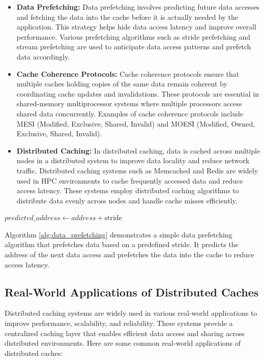 \documentclass[12pt]{book} %
\begin{document}
\begin{itemize}
    \item \textbf{Data Prefetching:} Data prefetching involves predicting future data accesses and fetching the data into the cache before it is actually needed by the application. This strategy helps hide data access latency and improve overall performance. Various prefetching algorithms such as stride prefetching and stream prefetching are used to anticipate data access patterns and prefetch data accordingly.
    
    \item \textbf{Cache Coherence Protocols:} Cache coherence protocols ensure that multiple caches holding copies of the same data remain coherent by coordinating cache updates and invalidations. These protocols are essential in shared-memory multiprocessor systems where multiple processors access shared data concurrently. Examples of cache coherence protocols include MESI (Modified, Exclusive, Shared, Invalid) and MOESI (Modified, Owned, Exclusive, Shared, Invalid).
    
    \item \textbf{Distributed Caching:} In distributed caching, data is cached across multiple nodes in a distributed system to improve data locality and reduce network traffic. Distributed caching systems such as Memcached and Redis are widely used in HPC environments to cache frequently accessed data and reduce access latency. These systems employ distributed caching algorithms to distribute data evenly across nodes and handle cache misses efficiently.
\end{itemize}

\FloatBarrier
\begin{algorithm}[h]
\caption{Data Prefetching Algorithm}\label{alg:data_prefetching}
\begin{algorithmic}[1]
    \State $predicted\_address \gets address + \text{stride}$
    \State {}
\EndFunction
\end{algorithmic}
\end{algorithm}
\FloatBarrier

Algorithm \ref{alg:data_prefetching} demonstrates a simple data prefetching algorithm that prefetches data based on a predefined stride. It predicts the address of the next data access and prefetches the data into the cache to reduce access latency.

\subsection{Real-World Applications of Distributed Caches}
Distributed caching systems are widely used in various real-world applications to improve performance, scalability, and reliability. These systems provide a centralized caching layer that enables efficient data access and sharing across distributed environments. Here are some common real-world applications of distributed caches:
\end{document}
